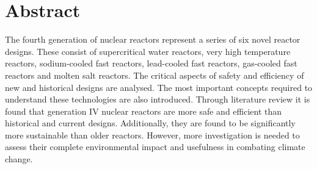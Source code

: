 

\chapter*{Abstract} \label{cha:abstract}


The fourth generation of nuclear reactors represent a series of six novel reactor designs.
These consist of supercritical water reactors, very high temperature reactors, sodium-cooled fast
reactors, lead-cooled fast reactors, gas-cooled fast reactors and molten salt reactors.
The critical aspects of safety and efficiency
of new and historical designs are analysed.
The most important concepts required to understand these technologies are
also introduced. 
Through literature review it is found that generation IV nuclear reactors are more safe
and efficient than historical and current designs. Additionally, they are found to be 
significantly more sustainable than older reactors. However, more
investigation is needed to assess their complete environmental impact and usefulness
in combating climate change.

